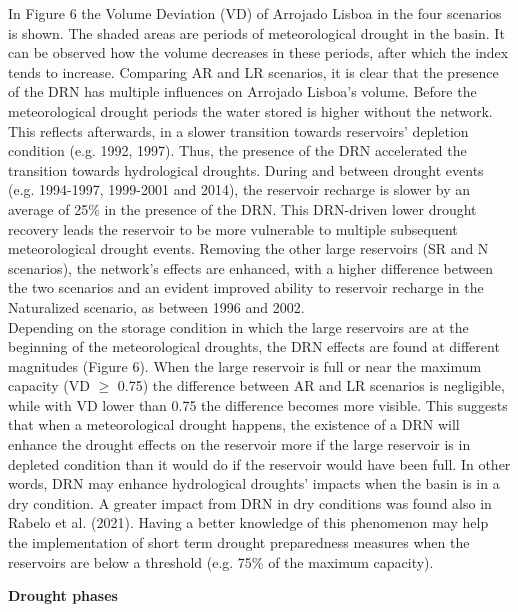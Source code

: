 \documentclass[draft]{agujournal2019}
\begin{document}
In Figure 6 the Volume Deviation (VD) of Arrojado Lisboa in the four scenarios is shown. The shaded areas are periods of meteorological drought in the basin. It can be observed how the volume decreases in these periods, after which the index tends to increase. Comparing AR and LR scenarios, it is clear that the presence of the DRN has multiple influences on Arrojado Lisboa’s volume. Before the meteorological drought periods the water stored is higher without the network. This reflects afterwards, in a slower transition towards reservoirs’ depletion condition (e.g. 1992, 1997). Thus, the presence of the DRN accelerated the transition towards hydrological droughts. During and between drought events (e.g. 1994-1997, 1999-2001 and 2014), the reservoir recharge is slower by an average of 25\% in the presence of the DRN. This DRN-driven lower drought recovery leads the reservoir to be more vulnerable to multiple subsequent meteorological drought events. Removing the other large reservoirs (SR and N scenarios), the network’s effects are enhanced, with a higher difference between the two scenarios and an evident improved ability to reservoir recharge in the Naturalized scenario, as between 1996 and 2002.\\
Depending on the storage condition in which the large reservoirs are at the beginning of the meteorological droughts, the DRN effects are found at different magnitudes (Figure 6). When the large reservoir is full or near the maximum capacity (VD $\geq$ 0.75) the difference between AR and LR scenarios is negligible, while with VD lower than 0.75 the difference becomes more visible. This suggests that when a meteorological drought happens, the existence of a DRN will enhance the drought effects on the reservoir more if the large reservoir is in depleted condition than it would do if the reservoir would have been full. In other words, DRN may enhance hydrological droughts' impacts when the basin is in a dry condition. A greater impact from DRN in dry conditions was found also in Rabelo et al. (2021). Having a better knowledge of this phenomenon may help the implementation of short term drought preparedness measures when the reservoirs are below a threshold (e.g. 75\% of the maximum capacity).

\textbf{Drought phases}
\end{document}
